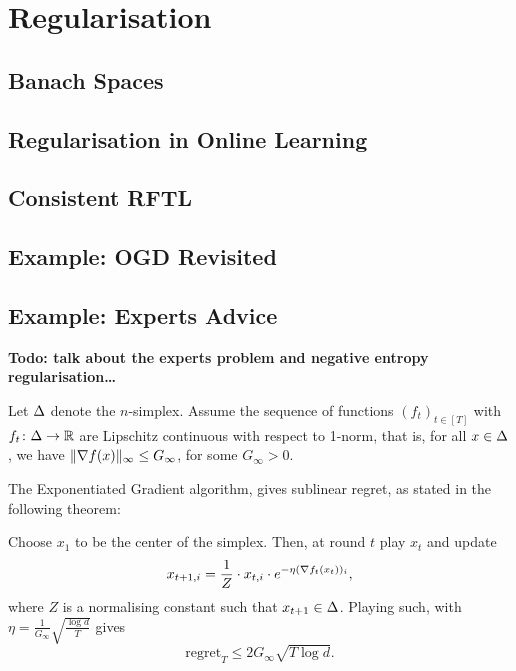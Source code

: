 \chapter{Regularisation}

\section{Banach Spaces}


\section{Regularisation in Online Learning}

\section{Consistent RFTL}

\section{Example: OGD Revisited}
\section{Example: Experts Advice}
\textbf{Todo: talk  about the experts problem and negative entropy regularisation\dots} 

Let $\Delta$ denote the $n$-simplex. Assume the sequence of functions $(f_t)_{t\in[T]}$ with $f_t\colon\Delta\to \mathbb{R}$ are Lipschitz continuous with respect to 1-norm, that is, for all $x\in\Delta$, we have $\|\nabla f(x)\|_\infty \leq G_\infty$, for some $G_\infty>0$.

The Exponentiated Gradient algorithm, gives sublinear regret, as stated in the following theorem:
\begin{theorem}
    Choose $x_1$ to be the center of the simplex. Then, at round $t$ play $x_t$ and update
    \[
        x_{t+1, i} = \frac{1}{Z}\cdot x_{t,i} \cdot e^{-\eta (\nabla f_t(x_t))_i},
    \]
    where $Z$ is a normalising constant such that $x_{t+1}\in \Delta$. Playing such, with $\eta = \frac{1}{G_\infty} \sqrt{\frac{\log d}{T}}$ gives
    \[
        \mathrm{regret}_T \leq 2G_\infty \sqrt{T \log d}.
    \]
\end{theorem}

